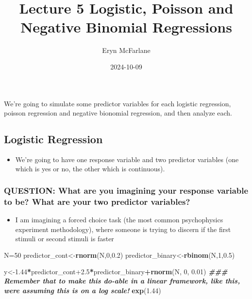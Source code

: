 \documentclass[
]{article}
\title{Lecture 5 Logistic, Poisson and Negative Binomial Regressions}
\author{Eryn McFarlane}
\date{2024-10-09}
\newenvironment{Shaded}{\begin{snugshade}}{\end{snugshade}}
\newcommand{\DecValTok}[1]{\textcolor[rgb]{0.00,0.00,0.81}{#1}}
\newcommand{\DocumentationTok}[1]{\textcolor[rgb]{0.56,0.35,0.01}{\textbf{\textit{#1}}}}
\newcommand{\FloatTok}[1]{\textcolor[rgb]{0.00,0.00,0.81}{#1}}
\newcommand{\FunctionTok}[1]{\textcolor[rgb]{0.13,0.29,0.53}{\textbf{#1}}}
\newcommand{\NormalTok}[1]{#1}
\newcommand{\OtherTok}[1]{\textcolor[rgb]{0.56,0.35,0.01}{#1}}
\newcommand{\SpecialCharTok}[1]{\textcolor[rgb]{0.81,0.36,0.00}{\textbf{#1}}}
\providecommand{\tightlist}{%
  \setlength{\itemsep}{0pt}\setlength{\parskip}{0pt}}
\begin{document}
\maketitle

We're going to simulate some predictor variables for each logistic
regression, poisson regression and negative bionomial regression, and
then analyze each.

\subsection{Logistic Regression}\label{logistic-regression}

\begin{itemize}
\tightlist
\item
  We're going to have one response variable and two predictor variables
  (one which is yes or no, the other which is continuous).
\end{itemize}

\subsubsection{QUESTION: What are you imagining your response variable
to be? What are your two predictor
variables?}\label{question-what-are-you-imagining-your-response-variable-to-be-what-are-your-two-predictor-variables}

\begin{itemize}
\tightlist
\item
  I am imagining a forced choice task (the most common psychophysics
  experiment methodology), where someone is trying to discern if the
  first stimuli or second stimuli is faster
\end{itemize}

\begin{Shaded}
\begin{Highlighting}[]
\NormalTok{N}\OtherTok{=}\DecValTok{50}
\NormalTok{predictor\_cont}\OtherTok{\textless{}{-}}\FunctionTok{rnorm}\NormalTok{(N,}\DecValTok{0}\NormalTok{,}\FloatTok{0.2}\NormalTok{) }
\NormalTok{predictor\_binary}\OtherTok{\textless{}{-}}\FunctionTok{rbinom}\NormalTok{(N,}\DecValTok{1}\NormalTok{,}\FloatTok{0.5}\NormalTok{)}

\NormalTok{y}\OtherTok{\textless{}{-}}\FloatTok{1.44}\SpecialCharTok{*}\NormalTok{predictor\_cont}\FloatTok{+2.5}\SpecialCharTok{*}\NormalTok{predictor\_binary}\SpecialCharTok{+}\FunctionTok{rnorm}\NormalTok{(N, }\DecValTok{0}\NormalTok{, }\FloatTok{0.01}\NormalTok{) }\DocumentationTok{\#\#\# Remember that to make this do{-}able in a linear framework, like this, we\textquotesingle{}re assuming this is on a log scale!}
\FunctionTok{exp}\NormalTok{(}\FloatTok{1.44}\NormalTok{)}
\end{Highlighting}
\end{Shaded}
\end{document}
